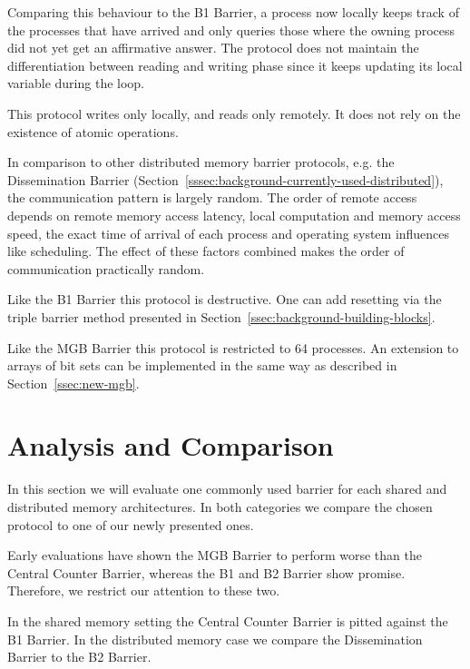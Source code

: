 \documentclass[a4paper, 10pt]{article}
\newcommand*\cleartooddpage{
	\clearpage
	\ifthenelse{\isodd{\thepage}}
		{}
		{\newpage \mbox{} \clearpage}
}
\begin{document}
Comparing this behaviour to the B1 Barrier, a process now locally keeps track of the processes that have arrived and only queries those where the owning process did not yet get an affirmative answer.
The protocol does not maintain the differentiation between reading and writing phase since it keeps updating its local variable during the loop.

This protocol writes only locally, and reads only remotely. It does not rely on the existence of atomic operations.

In comparison to other distributed memory barrier protocols, e.g. the Dissemination Barrier (Section~\ref{sssec:background-currently-used-distributed}), the communication pattern is largely random. The order of remote access depends on remote memory access latency, local computation and memory access speed, the exact time of arrival of each process and operating system influences like scheduling. The effect of these factors combined makes the order of communication practically random.

Like the B1 Barrier this protocol is destructive. One can add resetting via the triple barrier method presented in Section~\ref{ssec:background-building-blocks}.

Like the MGB Barrier this protocol is restricted to 64 processes. An extension to arrays of bit sets can be implemented in the same way as described in Section~\ref{ssec:new-mgb}.

\cleartooddpage
\section{Analysis and Comparison}
\label{sec:analysis}

In this section we will evaluate one commonly used barrier for each shared and distributed memory architectures. In both categories we compare the chosen protocol to one of our newly presented ones.

Early evaluations have shown the MGB Barrier to perform worse than the Central Counter Barrier, whereas the B1 and B2 Barrier show promise. Therefore, we restrict our attention to these two.

In the shared memory setting the Central Counter Barrier is pitted against the B1 Barrier. In the distributed memory case we compare the Dissemination Barrier to the B2 Barrier.
\end{document}
